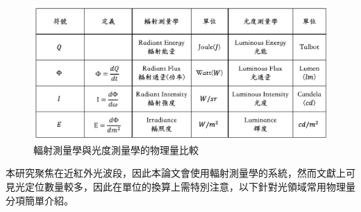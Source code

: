         \begin{figure}[ht]
            \centering
            \includegraphics[width=14cm]{ch2pic/photometry_table.png}
            \caption{輻射測量學與光度測量學的物理量比較}
            \label{tab:photometry}
        \end{figure}


        本研究聚焦在近紅外光波段，因此本論文會使用輻射測量學的系統，然而文獻上可見光定位數量較多，因此在單位的換算上需特別注意，以下針對光領域常用物理量分項簡單介紹。


